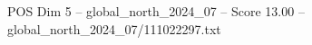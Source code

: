 \begin{textsample}{POS Dim 5 – global\_north\_2024\_07 – Score 13.00 – global\_north\_2024\_07/111022297.txt}
\end{textsample}
